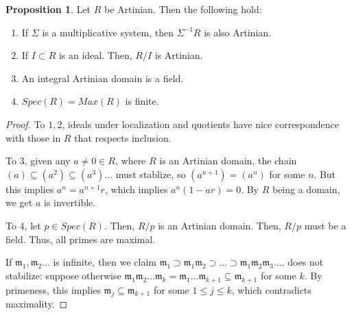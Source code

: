 \documentclass{article}
\theoremstyle{definition}
\theoremstyle{definition}
\theoremstyle{definition}
\newtheorem{proposition}{Proposition}[section]
\theoremstyle{definition}
\theoremstyle{definition}
\theoremstyle{definition}
\theoremstyle{definition}
\begin{document}
\begin{tcolorbox}[colback=blue!5!white,colframe=blue!30!white]
\begin{proposition}
Let $R$ be Artinian. Then the following hold:
\begin{enumerate}
    \item If $\Sigma$ is a multiplicative system, then $\Sigma^{-1}R$ is also Artinian.
    \item If $I\subset R$ is an ideal. Then, $R/I$ is Artinian.
    \item An integral Artinian domain is a field. 
    \item $Spec(R)=Max(R)$ is finite. 
\end{enumerate}
\end{proposition}
\end{tcolorbox}
\begin{proof}
    To $1,2$, ideals under localization and quotients have nice correspondence with those in $R$ that respects inclusion. 

    To $3$, given any $a\neq 0 \in R$, where $R$ is an Artinian domain, the chain $(a)\subseteq (a^2)\subseteq (a^3)...$ must stablize, so $(a^{n+1})=(a^n)$ for some $n$. But this implies $a^n=a^{n+1}r$, which implies $a^n(1-ar)=0$. By $R$ being a domain, we get $a$ is invertible. 
    
    To $4$, let $p\in Spec(R)$. Then, $R/p$ is an Artinian domain. Then, $R/p$ must be a field. Thus, all primes are maximal.
    

    If $\mathfrak{m_1},\mathfrak{m_2}...$ is infinite, then we claim $\mathfrak{m}_1\supset \mathfrak{m}_1\mathfrak{m}_2\supset ...\supset \mathfrak{m_1}\mathfrak{m}_2\mathfrak{m}_3....$ does not stabilize: suppose otherwise $\mathfrak{m}_1 \mathfrak{m}_2...\mathfrak{m}_k=\mathfrak{m_1}...\mathfrak{m}_{k+1}\subseteq \mathfrak{m}_{k+1}$ for some $k$. By primeness, this implies $\mathfrak{m}_j\subseteq \mathfrak{m}_{k+1}$ for some $1\leq j\leq k $, which contradicts maximality. 
\end{proof}
\end{document}
